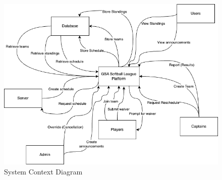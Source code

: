 \documentclass[12pt, titlepage]{article}
\begin{document}
\begin{figure}[H]
    \centering
    \includegraphics[width=\linewidth]{Context_diagram.png}
    \caption{System Context Diagram}
    \label{fig:context_diagram}
\end{figure}
\pagebreak
\end{document}
